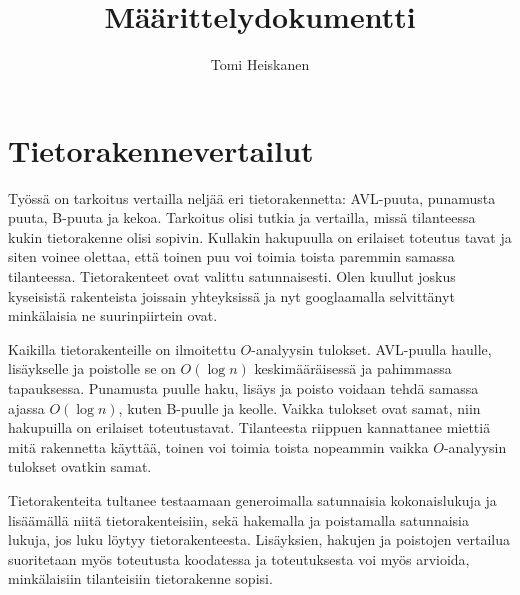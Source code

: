 \documentclass[12pt, leqno, a4paper]{article}
\begin{document}
\title{Määrittelydokumentti}
\author{Tomi Heiskanen}

\thispagestyle{empty}
\maketitle

\section*{Tietorakennevertailut}

Työssä on tarkoitus vertailla neljää eri tietorakennetta: AVL-puuta, punamusta
puuta, B-puuta ja kekoa. Tarkoitus olisi tutkia ja vertailla, missä tilanteessa
kukin tietorakenne olisi sopivin. Kullakin hakupuulla on erilaiset toteutus 
tavat ja siten voinee olettaa, että toinen puu voi toimia toista paremmin
samassa tilanteessa. Tietorakenteet ovat valittu satunnaisesti. Olen kuullut 
joskus kyseisistä rakenteista joissain yhteyksissä ja nyt googlaamalla selvittänyt 
minkälaisia ne suurinpiirtein ovat.

Kaikilla tietorakenteille on ilmoitettu $O$-analyysin tulokset. AVL-puulla haulle,
lisäykselle ja poistolle se on $O(\log n)$ keskimääräisessä ja pahimmassa 
tapauksessa. Punamusta puulle haku, lisäys ja poisto voidaan tehdä samassa 
ajassa $O(\log n)$, kuten B-puulle ja keolle. Vaikka tulokset ovat samat, niin
hakupuilla on erilaiset toteutustavat. Tilanteesta riippuen kannattanee miettiä
mitä rakennetta käyttää, toinen voi toimia toista nopeammin vaikka $O$-analyysin
tulokset ovatkin samat.

Tietorakenteita tultanee testaamaan generoimalla satunnaisia kokonaislukuja ja
lisäämällä niitä tietorakenteisiin, sekä hakemalla ja poistamalla satunnaisia 
lukuja, jos luku löytyy tietorakenteesta. Lisäyksien, hakujen ja poistojen vertailua
suoritetaan myös toteutusta koodatessa ja toteutuksesta voi myös arvioida,
minkälaisiin tilanteisiin tietorakenne sopisi.

\nocite{AVL}
\nocite{PM}
\nocite{Keko}
\nocite{B-puu}
\renewcommand{\refname}{Lähteet}


\end{document}
